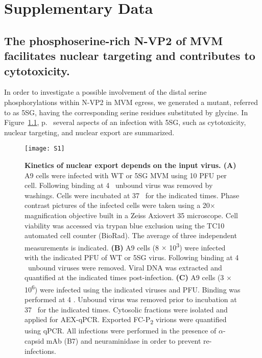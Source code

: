
\chapter{Supplementary Data} %

\label{Results} %


\section{The phosphoserine-rich N-VP2 of MVM facilitates nuclear targeting and contributes to cytotoxicity.}
\label{Cytoskeleton}


\renewcommand{\thefigure}{S\arabic{figure}}
\setcounter{figure}{0}

In order to investigate a possible involvement of the distal serine phosphorylations within N-VP2 in MVM egress, we generated a mutant, referred to as 5SG, having the corresponding serine residues substituted by glycine. In Figure~\ref{S1}, p.~\pageref{S1} several aspects of an infection with 5SG, such as cytotoxicity, nuclear targeting, and nuclear export are summarized.

\begin{figure}
\centering
  \texttt{[image: S1]}
  \caption[Kinetics of nuclear export depends on the input virus.]
   {\textbf{Kinetics of nuclear export depends on the input virus. (A)} A9 cells were infected with WT or 5SG MVM using 10 PFU per cell. Following binding at 4 \textcelsius~unbound virus was removed by washings. Cells were incubated at 37 \textcelsius~for the indicated times. Phase contrast pictures of the infected cells were taken using a 20$\times$ magnification objective built in a Zeiss Axiovert 35 microscope. Cell viability was accessed via trypan blue exclusion using the TC10\textsuperscript{\texttrademark} automated cell counter (BioRad). The average of three independent measurements is indicated. \textbf{(B)} A9 cells (8 $\times$ 10\textsuperscript{3}) were infected with the indicated PFU of WT or 5SG virus. Following binding at 4 \textcelsius~unbound viruses were removed. Viral DNA was extracted and quantified at the indicated times post-infection. \textbf{(C)} A9 cells (3 $\times$ 10\textsuperscript{6}) were infected using the indicated viruses and PFU. Binding was performed at 4 \textcelsius. Unbound virus was removed prior to incubation at 37 \textcelsius~for the indicated times. Cytosolic fractions were isolated and applied for AEX-qPCR. Exported FC-P\textsubscript{2} virions were quantified using qPCR. All infections were performed in the presence of $\alpha$-capsid mAb (B7) and neuraminidase in order to prevent re-infections.} 
\label{S1}
\end{figure}



